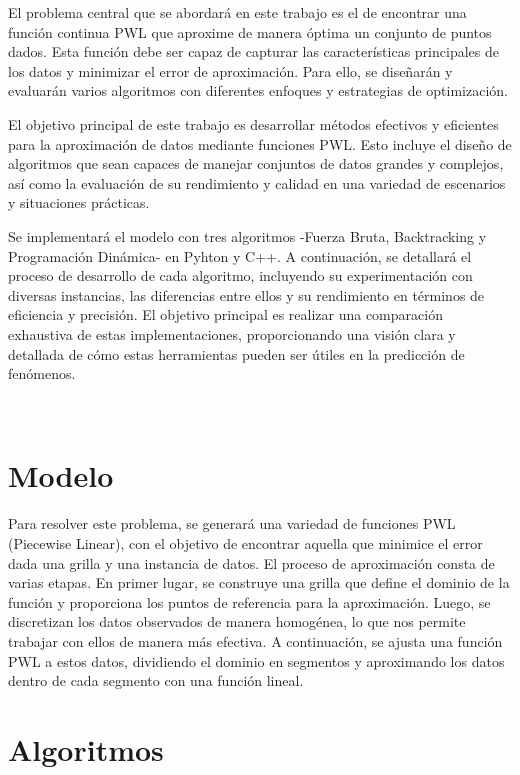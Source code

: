 \documentclass{article}
\begin{document}
    El problema central que se abordará en este trabajo es el de encontrar una función continua PWL que aproxime de manera óptima un conjunto de puntos dados. Esta función debe ser capaz de capturar las características principales de los datos y minimizar el error de aproximación. Para ello, se diseñarán y evaluarán varios algoritmos con diferentes enfoques y estrategias de optimización.

    El objetivo principal de este trabajo es desarrollar métodos efectivos y eficientes para la aproximación de datos mediante funciones PWL. Esto incluye el diseño de algoritmos que sean capaces de manejar conjuntos de datos grandes y complejos, así como la evaluación de su rendimiento y calidad en una variedad de escenarios y situaciones prácticas.
    
    Se implementará el modelo con tres algoritmos -Fuerza Bruta, Backtracking y Programación Dinámica- en Pyhton y C++. A continuación, se detallará el proceso de desarrollo de cada algoritmo, incluyendo su experimentación con diversas instancias, las diferencias entre ellos y su rendimiento en términos de eficiencia y precisión. El objetivo principal es realizar una comparación exhaustiva de estas implementaciones, proporcionando una visión clara y detallada de cómo estas herramientas pueden ser útiles en la predicción de fenómenos.
    
    \\
 
\section{Modelo}
    \vspace{0.5cm}
    Para resolver este problema, se generará una variedad de funciones PWL (Piecewise Linear), con el objetivo de encontrar aquella que minimice el error dada una grilla y una instancia de datos. El proceso de aproximación consta de varias etapas. En primer lugar, se construye una grilla que define el dominio de la función y proporciona los puntos de referencia para la aproximación. Luego, se discretizan los datos observados de manera homogénea, lo que nos permite trabajar con ellos de manera más efectiva. A continuación, se ajusta una función PWL a estos datos, dividiendo el dominio en segmentos y aproximando los datos dentro de cada segmento con una función lineal.
    \\
    
\section{Algoritmos}
    \vspace{0.5cm}
\end{document}
